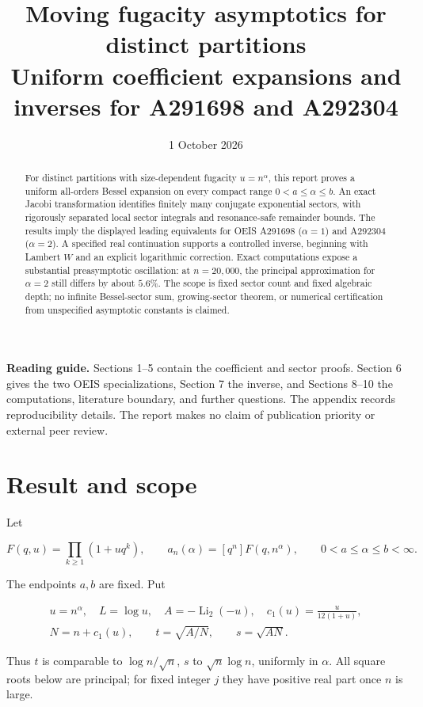\documentclass[11pt,letterpaper]{article}
\title{\textbf{Moving fugacity asymptotics for distinct partitions}\\[7pt]\large Uniform coefficient expansions and inverses for A291698 and A292304}
\author{}\date{1 October 2026}
\begin{document}
\maketitle\thispagestyle{empty}
\begin{abstract}
For distinct partitions with size-dependent fugacity $u=n^\alpha$, this report proves a uniform all-orders Bessel expansion on every compact range $0<a\le\alpha\le b$. An exact Jacobi transformation identifies finitely many conjugate exponential sectors, with rigorously separated local sector integrals and resonance-safe remainder bounds. The results imply the displayed leading equivalents for OEIS A291698 ($\alpha=1$) and A292304 ($\alpha=2$). A specified real continuation supports a controlled inverse, beginning with Lambert $W$ and an explicit logarithmic correction. Exact computations expose a substantial preasymptotic oscillation: at $n=20{,}000$, the principal approximation for $\alpha=2$ still differs by about $5.6\%$. The scope is fixed sector count and fixed algebraic depth; no infinite Bessel-sector sum, growing-sector theorem, or numerical certification from unspecified asymptotic constants is claimed.
\end{abstract}
\vspace{5pt}
\textbf{Reading guide.} Sections 1--5 contain the coefficient and sector proofs. Section 6 gives the two OEIS specializations, Section 7 the inverse, and Sections 8--10 the computations, literature boundary, and further questions. The appendix records reproducibility details. The report makes no claim of publication priority or external peer review.
\newpage
\tableofcontents
\newpage
\section{Result and scope}\label{mfp:result-and-scope}

Let

\[
 F(q,u)=\prod_{k\ge1}(1+u q^k),\qquad
 a_n(\alpha)=[q^n]F(q,n^\alpha),\qquad 0<a\le\alpha\le b<\infty.
\]

The endpoints \(a,b\) are fixed. Put

\[
 \begin{gathered}
 u=n^\alpha,\quad L=\log u,\quad A=-\operatorname{Li}_2(-u),\quad c_1(u)=\frac{u}{12(1+u)},\\
 N=n+c_1(u),\qquad t=\sqrt{A/N},\qquad s=\sqrt{AN}.
 \end{gathered}
\]

Thus \(t\) is comparable to \(\log n/\sqrt n\), \(s\) to
\(\sqrt n\log n\), uniformly in \(\alpha\). All square roots below are
principal; for fixed integer \(j\) they have positive real part once
\(n\) is large.
\end{document}
